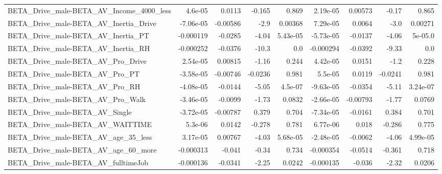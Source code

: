 \begin{tabular}{lrrrrrrrr}
BETA\_Drive\_male-BETA\_AV\_Income\_4000\_less           &     4.6e-05 &       0.0113 &   -0.165 &    0.869 &   2.19e-05 &     0.00573 &        -0.17 &         0.865 \\
BETA\_Drive\_male-BETA\_AV\_Inertia\_Drive              &   -7.06e-05 &     -0.00586 &     -2.9 &  0.00368 &   7.29e-05 &      0.0064 &         -3.0 &       0.00271 \\
BETA\_Drive\_male-BETA\_AV\_Inertia\_PT                 &   -0.000119 &      -0.0285 &    -4.04 & 5.43e-05 &  -5.73e-05 &     -0.0137 &        -4.06 &       5e-05.0 \\
BETA\_Drive\_male-BETA\_AV\_Inertia\_RH                 &   -0.000252 &      -0.0376 &    -10.3 &      0.0 &  -0.000294 &     -0.0392 &        -9.33 &           0.0 \\
BETA\_Drive\_male-BETA\_AV\_Pro\_Drive                  &    2.54e-05 &      0.00815 &    -1.16 &    0.244 &   4.42e-05 &      0.0151 &         -1.2 &         0.228 \\
BETA\_Drive\_male-BETA\_AV\_Pro\_PT                     &   -3.58e-05 &     -0.00746 &  -0.0236 &    0.981 &    5.5e-05 &      0.0119 &      -0.0241 &         0.981 \\
BETA\_Drive\_male-BETA\_AV\_Pro\_RH                     &   -4.08e-05 &      -0.0144 &    -5.05 &  4.5e-07 &  -9.63e-05 &     -0.0354 &        -5.11 &      3.24e-07 \\
BETA\_Drive\_male-BETA\_AV\_Pro\_Walk                   &   -3.46e-05 &      -0.0099 &    -1.73 &   0.0832 &  -2.66e-05 &    -0.00793 &        -1.77 &        0.0769 \\
BETA\_Drive\_male-BETA\_AV\_Single                     &   -3.72e-05 &     -0.00787 &    0.379 &    0.704 &  -7.34e-05 &     -0.0161 &        0.384 &         0.701 \\
BETA\_Drive\_male-BETA\_AV\_WAITTIME                   &     5.3e-06 &       0.0142 &   -0.278 &    0.781 &   6.77e-06 &       0.018 &       -0.286 &         0.775 \\
BETA\_Drive\_male-BETA\_AV\_age\_35\_less                &    3.17e-05 &      0.00767 &    -4.03 & 5.68e-05 &  -2.48e-05 &     -0.0062 &        -4.06 &      4.99e-05 \\
BETA\_Drive\_male-BETA\_AV\_age\_60\_more                &   -0.000313 &       -0.041 &    -0.34 &    0.734 &  -0.000354 &     -0.0514 &       -0.361 &         0.718 \\
BETA\_Drive\_male-BETA\_AV\_fulltimeJob                &   -0.000136 &      -0.0341 &    -2.25 &   0.0242 &  -0.000135 &      -0.036 &        -2.32 &        0.0206 \\

\end{tabular}
